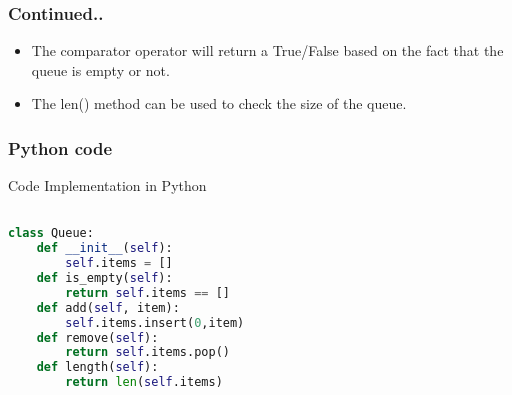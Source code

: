 \documentclass{beamer}
\begin{document}
\begin{frame}
\frametitle{Continued..}
\begin{itemize}



\item The comparator operator will return a True/False based on the fact that the queue is empty or not.

\item The len() method can be used to check the size of the queue.



\end{itemize}
\end{frame}

\begin{frame}[fragile]
\frametitle{Python code}

Code Implementation in Python
\begin{lstlisting}[language=Python]

class Queue:
	def __init__(self):
		self.items = []
	def is_empty(self):
		return self.items == []
	def add(self, item):
		self.items.insert(0,item)
	def remove(self):
		return self.items.pop()
	def length(self):
		return len(self.items)
\end{lstlisting}

\end{frame}
\end{document}
